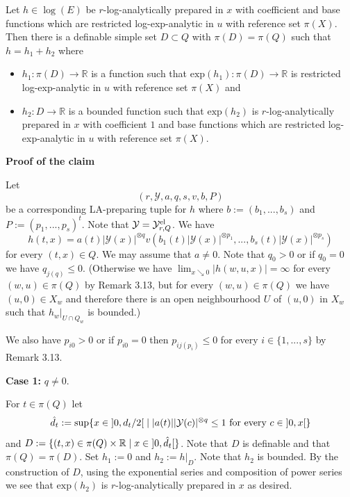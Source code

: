 \documentclass[12pt]{article}
\def\vs{\vspace}
\def\exp{\mathrm{exp}}
\begin{document}
\vs{0.1cm}
Let $h \in \log(E)$ be $r$-log-analytically prepared in $x$ with coefficient and base functions which are restricted log-exp-analytic in $u$ with reference set $\pi(X)$. Then there is a definable simple set $D \subset Q$ with $\pi(D)=\pi(Q)$ such that $h=h_1 + h_2$ where
\begin{itemize}
	\item [(1)] $h_1:\pi(D) \to \mathbb{R}$ is a function such that $\exp(h_1):\pi(D) \to \mathbb{R}$ is restricted log-exp-analytic in $u$ with reference set $\pi(X)$ and
	\item [(2)] $h_2:D \to \mathbb{R}$ is a bounded function such that $\exp(h_2)$ is $r$-log-analytically prepared in $x$ with coefficient $1$ and base functions which are restricted log-exp-analytic in $u$ with reference set $\pi(X)$.  
\end{itemize}

\vs{0.3cm}
{\bf Proof of the claim}

\vs{0.1cm}
Let
$$(r,\mathcal{Y},a,q,s,v,b,P)$$
be a corresponding LA-preparing tuple for $h$ where $b:=(b_1,...,b_s)$ and $P:=(p_1,...,p_s)^t$. Note that $\mathcal{Y}=\mathcal{Y}_{r,Q}^{\textnormal{el}}$. We have
$$h(t,x)=a(t) \vert{\mathcal{Y}(x)}\vert^{\otimes q} v(b_1(t)\vert{\mathcal{Y}(x)}\vert^{\otimes p_1},...,b_s(t)\vert{\mathcal{Y}(x)}\vert^{\otimes p_s})$$
for every $(t,x) \in Q$. We may assume that $a \neq 0$. Note that $q_0>0$ or if $q_0=0$ we have $q_{j(q)} \leq 0$. (Otherwise we have $\lim_{x \searrow 0} \vert{h(w,u,x)}\vert = \infty$ for every $(w,u) \in \pi(Q)$ by Remark 3.13, but for every $(w,u) \in \pi(Q)$ we have $(u,0) \in X_w$ and therefore there is an open neighbourhood $U$ of $(u,0)$ in $X_w$ such that $h_w|_{U \cap Q_w}$ is bounded.)

\vs{0.1cm}
We also have $p_{i0}>0$ or if $p_{i0}=0$ then $p_{i j(p_i)}\leq 0$ for every $i \in \{1,...,s\}$ by Remark 3.13.

\vs{0.3cm}
{\bf Case 1:} $q \neq 0$.

\vs{0.2cm}
For $t \in \pi(Q)$ let 
$$\hat{d}_t:=\sup\{x \in \textnormal{} ]0,d_t/2[ \textnormal{} \mid  \vert{a(t)}\vert \vert{\mathcal{Y}(c)}\vert^{\otimes q} \leq 1 \textnormal{ for every } c \in \textnormal{} ]0,x[\}$$
and $D:=\{(t,x) \in \pi(Q) \times \mathbb{R} \mid x \in \textnormal{} ]0,\hat{d}_t[\}$. Note that $D$ is definable and that $\pi(Q)=\pi(D)$. Set $h_1:=0$ and $h_2:=h|_D$. Note that $h_2$ is bounded. By the construction of $D$, using the exponential series and composition of power series we see that $\exp(h_2)$ is $r$-log-analytically prepared in $x$ as desired.
\end{document}
